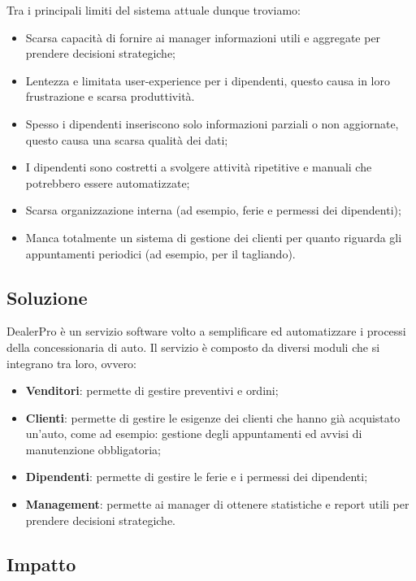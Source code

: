 \documentclass{article}
\begin{document}
  Tra i principali limiti del sistema attuale dunque troviamo:
  \begin{itemize}
    \item Scarsa capacità di fornire ai manager informazioni utili e aggregate per prendere decisioni strategiche;
    \item Lentezza e limitata user-experience per i dipendenti, questo causa in loro frustrazione e scarsa produttività. 
    \item Spesso i dipendenti inseriscono solo informazioni parziali o non aggiornate, questo causa una scarsa qualità dei dati;
    \item I dipendenti sono costretti a svolgere attività ripetitive e manuali che potrebbero essere automatizzate;
    \item Scarsa organizzazione interna (ad esempio, ferie e permessi dei dipendenti);
    \item Manca totalmente un sistema di gestione dei clienti per quanto riguarda gli appuntamenti periodici 
    (ad esempio, per il tagliando).
  \end{itemize}

  \subsection{Soluzione}

  DealerPro è un servizio software volto a semplificare ed automatizzare i processi della concessionaria di auto.
    Il servizio è composto da diversi moduli che si integrano tra loro, ovvero:
    \begin{itemize}
      \item \textbf{Venditori}: permette di gestire preventivi e ordini;
      \item \textbf{Clienti}: permette di gestire le esigenze dei clienti che hanno già acquistato un'auto, 
      come ad esempio: gestione degli appuntamenti ed avvisi di manutenzione obbligatoria;
      \item \textbf{Dipendenti}: permette di gestire le ferie e i permessi dei dipendenti;
      \item \textbf{Management}: permette ai manager di ottenere statistiche e report utili 
        per prendere decisioni strategiche.
    \end{itemize}

  \subsection{Impatto}
\end{document}
